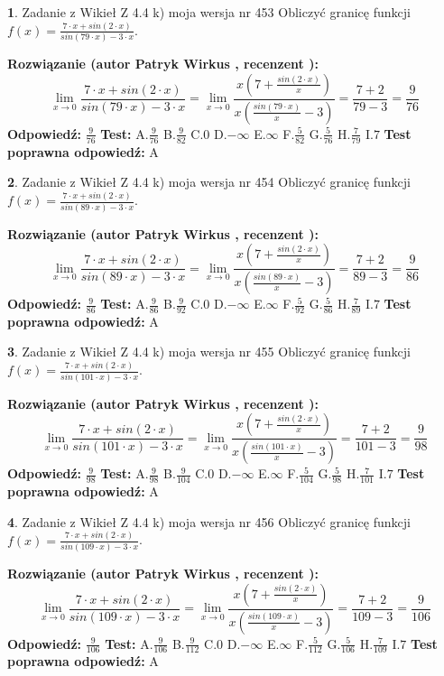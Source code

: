 \documentclass[12pt, a4paper]{article}
\theoremstyle{definition} %
\newtheorem{zad}{}
\newcommand{\zadStart}[1]{\begin{zad}#1\newline}
\newcommand{\zadStop}{\end{zad}}
\newcommand{\rozwStart}[2]{\noindent \textbf{Rozwiązanie (autor #1 , recenzent #2): }\newline}
\newcommand{\rozwStop}{\newline}
\newcommand{\odpStart}{\noindent \textbf{Odpowiedź:}\newline}
\newcommand{\odpStop}{\newline}
\newcommand{\testStart}{\noindent \textbf{Test:}\newline}
\newcommand{\testStop}{\newline}
\newcommand{\kluczStart}{\noindent \textbf{Test poprawna odpowiedź:}\newline}
\newcommand{\kluczStop}{\newline}
\begin{document}
\zadStart{Zadanie z Wikieł Z 4.4 k) moja wersja nr 453}
Obliczyć granicę funkcji $f(x)=\frac{7\cdot x +sin(2\cdot x)}{sin(79\cdot x) -3\cdot x}$.
\zadStop
\rozwStart{Patryk Wirkus}{}
$$\lim\limits_{x\to 0}\frac{7\cdot x +sin(2\cdot x)}{sin(79\cdot x) -3\cdot x}
=\lim\limits_{x\to 0}\frac{x(7+\frac{sin(2\cdot x)}{x})}{x(\frac{sin(79\cdot x)}{x}-3)}
=\frac{7+2}{79-3} = \frac{9}{76}$$
\rozwStop
\odpStart
$\frac{9}{76}$
\odpStop
\testStart
A.$\frac{9}{76}$
B.$\frac{9}{82}$
C.$0$
D.$-\infty$
E.$\infty$
F.$\frac{5}{82}$
G.$\frac{5}{76}$
H.$\frac{7}{79}$
I.$7$
\testStop
\kluczStart
A
\kluczStop



\zadStart{Zadanie z Wikieł Z 4.4 k) moja wersja nr 454}
Obliczyć granicę funkcji $f(x)=\frac{7\cdot x +sin(2\cdot x)}{sin(89\cdot x) -3\cdot x}$.
\zadStop
\rozwStart{Patryk Wirkus}{}
$$\lim\limits_{x\to 0}\frac{7\cdot x +sin(2\cdot x)}{sin(89\cdot x) -3\cdot x}
=\lim\limits_{x\to 0}\frac{x(7+\frac{sin(2\cdot x)}{x})}{x(\frac{sin(89\cdot x)}{x}-3)}
=\frac{7+2}{89-3} = \frac{9}{86}$$
\rozwStop
\odpStart
$\frac{9}{86}$
\odpStop
\testStart
A.$\frac{9}{86}$
B.$\frac{9}{92}$
C.$0$
D.$-\infty$
E.$\infty$
F.$\frac{5}{92}$
G.$\frac{5}{86}$
H.$\frac{7}{89}$
I.$7$
\testStop
\kluczStart
A
\kluczStop



\zadStart{Zadanie z Wikieł Z 4.4 k) moja wersja nr 455}
Obliczyć granicę funkcji $f(x)=\frac{7\cdot x +sin(2\cdot x)}{sin(101\cdot x) -3\cdot x}$.
\zadStop
\rozwStart{Patryk Wirkus}{}
$$\lim\limits_{x\to 0}\frac{7\cdot x +sin(2\cdot x)}{sin(101\cdot x) -3\cdot x}
=\lim\limits_{x\to 0}\frac{x(7+\frac{sin(2\cdot x)}{x})}{x(\frac{sin(101\cdot x)}{x}-3)}
=\frac{7+2}{101-3} = \frac{9}{98}$$
\rozwStop
\odpStart
$\frac{9}{98}$
\odpStop
\testStart
A.$\frac{9}{98}$
B.$\frac{9}{104}$
C.$0$
D.$-\infty$
E.$\infty$
F.$\frac{5}{104}$
G.$\frac{5}{98}$
H.$\frac{7}{101}$
I.$7$
\testStop
\kluczStart
A
\kluczStop



\zadStart{Zadanie z Wikieł Z 4.4 k) moja wersja nr 456}
Obliczyć granicę funkcji $f(x)=\frac{7\cdot x +sin(2\cdot x)}{sin(109\cdot x) -3\cdot x}$.
\zadStop
\rozwStart{Patryk Wirkus}{}
$$\lim\limits_{x\to 0}\frac{7\cdot x +sin(2\cdot x)}{sin(109\cdot x) -3\cdot x}
=\lim\limits_{x\to 0}\frac{x(7+\frac{sin(2\cdot x)}{x})}{x(\frac{sin(109\cdot x)}{x}-3)}
=\frac{7+2}{109-3} = \frac{9}{106}$$
\rozwStop
\odpStart
$\frac{9}{106}$
\odpStop
\testStart
A.$\frac{9}{106}$
B.$\frac{9}{112}$
C.$0$
D.$-\infty$
E.$\infty$
F.$\frac{5}{112}$
G.$\frac{5}{106}$
H.$\frac{7}{109}$
I.$7$
\testStop
\kluczStart
A
\kluczStop
\end{document}
